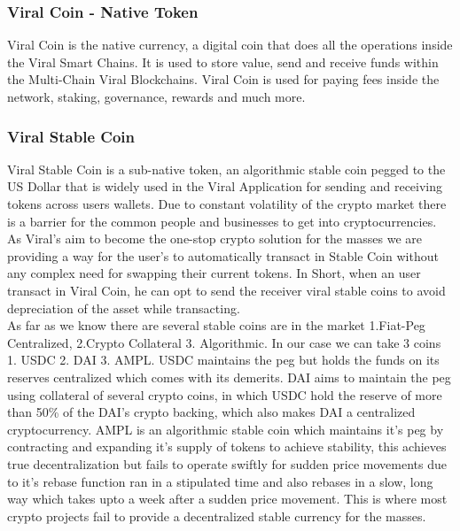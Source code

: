 \documentclass[conference]{IEEEtran}
\begin{document}
\subsubsection{\textbf{Viral Coin - Native Token}}

Viral Coin is the native currency, a digital coin that does all the operations inside the Viral Smart Chains. It is used to store value, send and receive funds within the Multi-Chain Viral Blockchains. Viral Coin is used for paying fees inside the network, staking, governance, rewards and much more.\\

\subsubsection{\textbf{Viral Stable Coin}}

Viral Stable Coin is a sub-native token, an algorithmic stable coin pegged to the US Dollar that is widely used in the Viral Application for sending and receiving tokens across users wallets. Due to constant volatility of the crypto market there is a barrier for the common people and businesses to get into cryptocurrencies. As Viral's aim to become the one-stop crypto solution for the masses we are providing a way for the user's to automatically transact in Stable Coin without any complex need for swapping their current tokens. In Short, when an user transact in Viral Coin, he can opt to send the receiver viral stable coins to avoid depreciation of the asset while transacting.\\

As far as we know there are several stable coins are in the market 1.Fiat-Peg Centralized, 2.Crypto Collateral 3. Algorithmic. In our case we can take 3 coins 1. USDC 2. DAI 3. AMPL. USDC maintains the peg but holds the funds on its reserves centralized which comes with its demerits. DAI aims to maintain the peg using collateral of several crypto coins, in which USDC hold the reserve of more than 50\% of the DAI's crypto backing, which also makes DAI a centralized cryptocurrency. AMPL is an algorithmic stable coin which maintains it's peg by contracting and expanding it's supply of tokens to achieve stability, this achieves true decentralization but fails to operate swiftly for sudden price movements due to it's rebase function ran in a stipulated time and also rebases in a slow, long way which takes upto a week after a sudden price movement. This is where most crypto projects fail to provide a decentralized stable currency for the masses.\\
\end{document}
